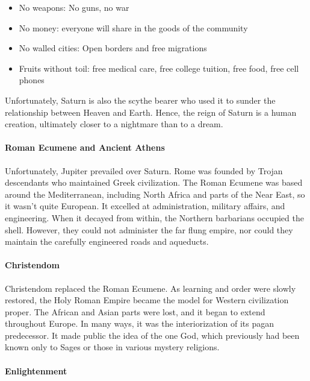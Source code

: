 \begin{itemize}


\item No weapons: No guns, no war

\item No money: everyone will share in the goods of the community

\item No walled cities: Open borders and free migrations

\item Fruits without toil: free medical care, free college tuition, free food, free cell phones
\end{itemize}


Unfortunately, Saturn is also the scythe bearer who used it to sunder the relationship between Heaven and Earth. Hence, the reign of Saturn is a human creation, ultimately closer to a nightmare than to a dream.

\paragraph{Roman Ecumene and Ancient Athens}


Unfortunately, Jupiter prevailed over Saturn. Rome was founded by Trojan descendants who maintained Greek civilization. The Roman Ecumene was based around the Mediterranean, including North Africa and parts of the Near East, so it wasn't quite European. It excelled at administration, military affairs, and engineering. When it decayed from within, the Northern barbarians occupied the shell. However, they could not administer the far flung empire, nor could they maintain the carefully engineered roads and aqueducts.

\paragraph{Christendom}


Christendom replaced the Roman Ecumene. As learning and order were slowly restored, the Holy Roman Empire became the model for Western civilization proper. The African and Asian parts were lost, and it began to extend throughout Europe. In many ways, it was the interiorization of its pagan predecessor. It made public the idea of the one God, which previously had been known only to Sages or those in various mystery religions.

\paragraph{Enlightenment}


